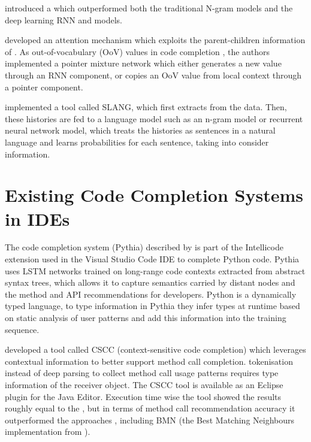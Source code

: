 \cite{Hell17a} introduced a   which outperformed both the traditional N-gram models and the deep learning RNN and   models.

\cite{Li17a} developed an attention mechanism which exploits the parent-children information of . As  out-of-vocabulary (OoV) values in code completion , the authors implemented a pointer mixture network which either generates a new value through an RNN component, or copies an OoV value from local context through a pointer component.

\cite{Rayc14a} implemented a tool called SLANG, which first extracts  from the data. Then, these histories are fed to a language model such as an n-gram model or recurrent neural network model, which treats the histories as sentences in a natural language and learns probabilities for each sentence,  taking into consider  information.

\section{Existing Code Completion Systems in IDEs}
\label{sec:RelatedWorks-ExistingSystems}
The code completion system (Pythia) described by \cite{Svya19a} is part of the Intellicode extension used in the Visual Studio Code IDE to complete Python code. Pythia uses LSTM networks trained on long-range code contexts extracted from abstract syntax trees, which allows it to capture semantics carried by distant nodes and  the method and API recommendations for developers.  Python is a dynamically typed language,  to   type information in Pythia they infer types at runtime based on static analysis of user patterns and add this information into the training sequence.

\cite{Asad14a} developed a tool called CSCC (context-sensitive code completion) which leverages contextual information to better support method call completion.  tokenisation instead of deep parsing to collect method call usage patterns requires type information of the receiver object. The CSCC tool is available as an Eclipse plugin for the Java Editor. Execution time wise the tool showed the results roughly equal to the , but in terms of method call recommendation accuracy it outperformed the  approaches , including BMN (the Best Matching Neighbours implementation from \cite{Bruc09a}).

